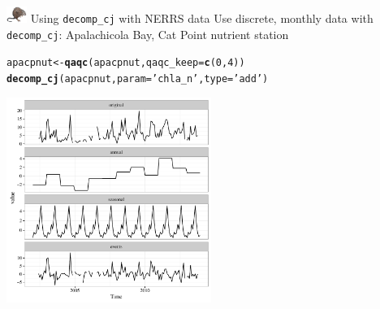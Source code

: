 \documentclass[xcolor=dvipsnames,serif]{beamer}\usepackage[]{graphicx}\usepackage[]{color}
\makeatletter
\newcommand{\hlnum}[1]{\textcolor[rgb]{0.686,0.059,0.569}{#1}}%
\newcommand{\hlstr}[1]{\textcolor[rgb]{0.192,0.494,0.8}{#1}}%
\newcommand{\hlstd}[1]{\textcolor[rgb]{0.345,0.345,0.345}{#1}}%
\newcommand{\hlkwb}[1]{\textcolor[rgb]{0.69,0.353,0.396}{#1}}%
\newcommand{\hlkwc}[1]{\textcolor[rgb]{0.333,0.667,0.333}{#1}}%
\newcommand{\hlkwd}[1]{\textcolor[rgb]{0.737,0.353,0.396}{\textbf{#1}}}%
\newenvironment{kframe}{%
 \def\at@end@of@kframe{}%
 \ifinner\ifhmode%
  \def\at@end@of@kframe{\end{minipage}}%
  \begin{minipage}{\columnwidth}%
 \fi\fi%
 \def\FrameCommand##1{\hskip\@totalleftmargin \hskip-\fboxsep
 \colorbox{shadecolor}{##1}\hskip-\fboxsep
     \hskip-\linewidth \hskip-\@totalleftmargin \hskip\columnwidth}%
 \MakeFramed {\advance\hsize-\width
   \@totalleftmargin\z@ \linewidth\hsize
   \@setminipage}}%
 {\par\unskip\endMakeFramed%
 \at@end@of@kframe}
\newenvironment{knitrout}{}{} %
\makeatother
\begin{document}
\begin{frame}[fragile]{\includegraphics[width = 0.05\textwidth]{imgs/swmprat.png} Using \texttt{decomp\_cj} with NERRS data}
Use discrete, monthly data with \texttt{decomp\_cj}: Apalachicola Bay, Cat Point nutrient station
\begin{knitrout}\scriptsize
{}\color{fgcolor}\begin{kframe}
\begin{alltt}
\hlstd{apacpnut} \hlkwb{<-} \hlkwd{qaqc}\hlstd{(apacpnut,} \hlkwc{qaqc_keep} \hlstd{=} \hlkwd{c}\hlstd{(}\hlnum{0}\hlstd{,} \hlnum{4}\hlstd{))}
\hlkwd{decomp_cj}\hlstd{(apacpnut,} \hlkwc{param} \hlstd{=} \hlstr{'chla_n'}\hlstd{,} \hlkwc{type} \hlstd{=} \hlstr{'add'}\hlstd{)}
\end{alltt}
\end{kframe}

{\centering \includegraphics[width=0.5\textwidth]{imgs/monthlydc-1} 

}



\end{knitrout}
\end{frame}
\end{document}
